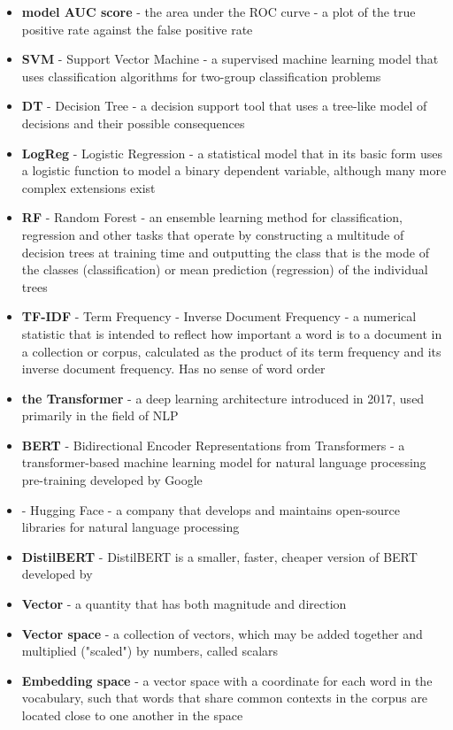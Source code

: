 \documentclass{article}
\begin{document}
\begin{itemize}
	\item \textbf{model AUC score} - the area under the ROC curve - a plot of the true positive rate against the false positive rate
	\item \textbf{SVM} - Support Vector Machine - a supervised machine learning model that uses classification algorithms for two-group classification problems
	\item \textbf{DT} - Decision Tree - a decision support tool that uses a tree-like model of decisions and their possible consequences
	\item \textbf{LogReg} - Logistic Regression - a statistical model that in its basic form uses a logistic function to model a binary dependent variable, although many more complex extensions exist
	\item \textbf{RF} - Random Forest - an ensemble learning method for classification, regression and other tasks that operate by constructing a multitude of decision trees at training time and outputting the class that is the mode of the classes (classification) or mean prediction (regression) of the individual trees
	\item \textbf{TF-IDF} - Term Frequency - Inverse Document Frequency - a numerical statistic that is intended to reflect how important a word is to a document in a collection or corpus, calculated as the product of its term frequency and its inverse document frequency. Has no sense of word order
	\item \textbf{the Transformer} - a deep learning architecture introduced in 2017, used primarily in the field of NLP\cite{vaswani2017attention}
	\item \textbf{BERT} - Bidirectional Encoder Representations from Transformers - a transformer-based machine learning model for natural language processing pre-training developed by Google\cite{devlin2019bert}
	\item {} - Hugging Face - a company that develops and maintains open-source libraries for natural language processing
	\item \textbf{DistilBERT} - DistilBERT is a smaller, faster, cheaper version of BERT developed by \cite{sanh2020distilbert}
	\item \textbf{Vector} - a quantity that has both magnitude and direction
	\item \textbf{Vector space} - a collection of vectors, which may be added together and multiplied ("scaled") by numbers, called scalars
	\item \textbf{Embedding space} - a vector space with a coordinate for each word in the vocabulary, such that words that share common contexts in the corpus are located close to one another in the space

\end{itemize}
\end{document}
